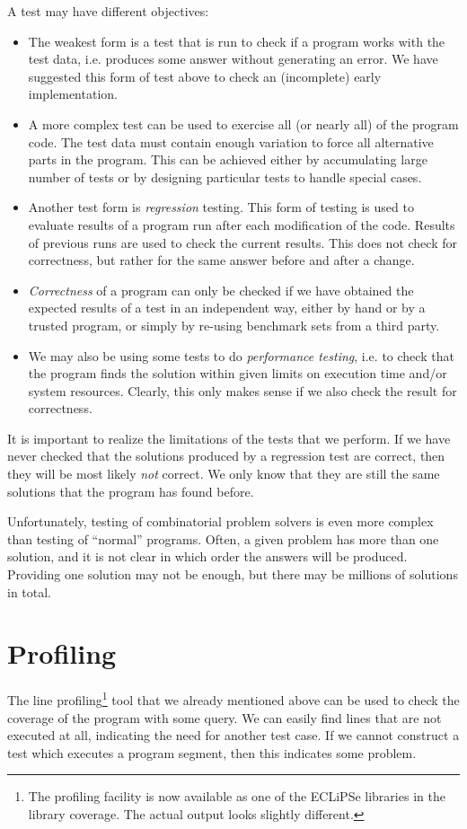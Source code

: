 \documentclass[a4paper,12pt]{report}
\begin{document}
A test may have different objectives:
\begin{itemize}
\item The weakest form is a test that is run to check if a program works with the test data, i.e. produces some answer without generating an error. We have suggested this form of test above to check an (incomplete) early implementation. 
\item A more complex test can be used to exercise all (or nearly all) of the program code. The test data must contain enough variation to force all alternative parts in the program. This can be achieved either by accumulating large number of tests or by designing particular tests to handle special cases.
\item Another test form is {\it regression} testing. This form of testing is used to evaluate results of a program run after each modification of the code. Results of previous runs are used to check the current results. This does not check for correctness, but rather for the same answer before and after a change.
\item {\it Correctness} of a program can only be checked if we have obtained the expected results of a test in an independent way, either by hand or by a trusted program, or simply by re-using benchmark sets from a third party.
\item We may also be using some tests to do {\it performance testing}, i.e. to check that the program finds the solution within given limits on execution time and/or system resources. Clearly, this only makes sense if we also check the result for correctness. 
\end{itemize}

It is important to realize the limitations of the tests that we perform. If we have never checked that the solutions produced by a regression test are correct, then they will be most likely {\it not} correct. We only know that they are still the same solutions that the program has found before.

Unfortunately, testing of combinatorial problem solvers is even more complex than testing of ``normal'' programs. Often, a given problem has more than one solution, and it is not clear in which order the answers will be produced. Providing one solution may not be enough, but there may be millions of solutions in total.

\section{Profiling}
The line profiling\footnote{The profiling facility is now available as one of the ECLiPSe libraries in the library coverage. The actual output looks slightly different.} tool that we already mentioned above can be used to check the coverage of the program with some query. We can easily find lines that are not executed at all, indicating the need for another test case. If we cannot construct a test which executes a program segment, then this indicates some problem.
\end{document}
